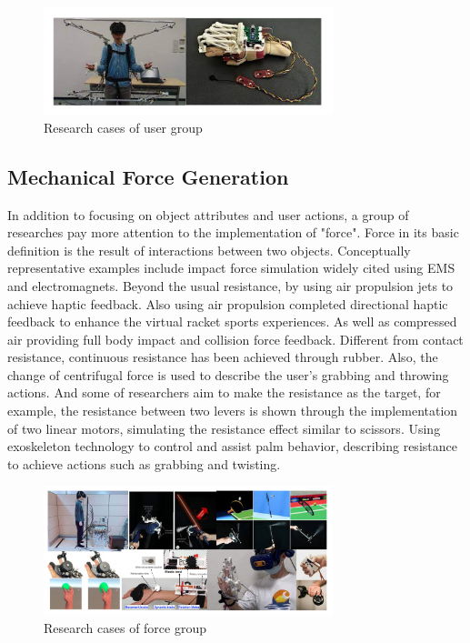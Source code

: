 \begin{figure}[h]
\centering
\includegraphics[width=0.75\textwidth]{A_thesis/figures/008.png}
\caption{Research cases of user group}
\end{figure}

\subsection{Mechanical Force Generation}
In addition to focusing on object attributes and user actions, a group of researches pay more attention to the implementation of "force". Force in its basic definition is the result of interactions between two objects. Conceptually representative examples include impact force simulation widely cited using EMS and electromagnets\cite{ref_MR001}. Beyond the usual resistance, by using air propulsion jets to achieve haptic feedback\cite{ref_007}. Also using air propulsion completed directional haptic feedback to enhance the virtual racket sports experiences\cite{ref_008}. As well as compressed air providing full body impact and collision force feedback\cite{ref_015}. Different from contact resistance, continuous resistance has been achieved through rubber\cite{ref_005}. Also, the change of centrifugal force is used to describe the user's grabbing and throwing actions\cite{ref_MR003}. And some of researchers aim to make the resistance as the target, for example, the resistance between two levers is shown through the implementation of two linear motors\cite{ref_014}, simulating the resistance effect similar to scissors\cite{ref_MR002}. Using exoskeleton technology to control and assist palm behavior, describing resistance to achieve actions such as grabbing and twisting\cite{ref_009}.

\begin{figure}[h]
\centering
\includegraphics[width=0.75\textwidth]{A_thesis/figures/009.png}
\caption{Research cases of force group}
\end{figure}


